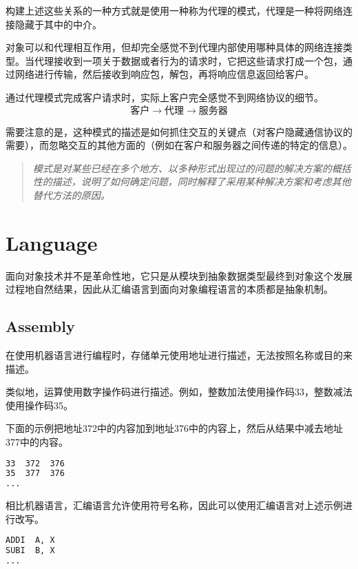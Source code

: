 构建上述这些关系的一种方式就是使用一种称为代理的模式，代理是一种将网络连接隐藏于其中的中介。

对象可以和代理相互作用，但却完全感觉不到代理内部使用哪种具体的网络连接类型。当代理接收到一项关于数据或者行为的请求时，它把这些请求打成一个包，通过网络进行传输，然后接收到响应包，解包，再将响应信息返回给客户。

通过代理模式完成客户请求时，实际上客户完全感觉不到网络协议的细节。
\[\mbox{客户}\longrightarrow \mbox{代理} \longrightarrow \mbox{服务器}\]

需要注意的是，这种模式的描述是如何抓住交互的关键点（对客户隐藏通信协议的需要），而忽略交互的其他方面的（例如在客户和服务器之间传递的特定的信息）。

\begin{quote}
\textsl{模式是对某些已经在多个地方、以多种形式出现过的问题的解决方案的概括性的描述，说明了如何确定问题，同时解释了采用某种解决方案和考虑其他替代方法的原因。}
\end{quote}




\chapter{Language}


面向对象技术并不是革命性地，它只是从模块到抽象数据类型最终到对象这个发展过程地自然结果，因此从汇编语言到面向对象编程语言的本质都是抽象机制。



\section{Assembly}





在使用机器语言进行编程时，存储单元使用地址进行描述，无法按照名称或目的来描述。

类似地，运算使用数字操作码进行描述。例如，整数加法使用操作码33，整数减法使用操作码35。


下面的示例把地址372中的内容加到地址376中的内容上，然后从结果中减去地址377中的内容。

\begin{lstlisting}[language=bash]
33  372  376
35  377  376
...  
\end{lstlisting}


相比机器语言，汇编语言允许使用符号名称，因此可以使用汇编语言对上述示例进行改写。

\begin{lstlisting}[language=bash]
ADDI  A, X
SUBI  B, X
...
\end{lstlisting}


